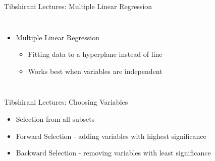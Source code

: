 \documentclass{beamer}
\begin{document}
\begin{frame}{Tibshirani Lectures: Multiple Linear Regression}
\begin{columns}
	\begin{itemize}
		\item<1-> Multiple Linear Regression
		\begin{itemize}
			\item<1-> Fitting data to a hyperplane instead of line
			\item<1-> Works best when variables are independent
		\end{itemize}
	\end{itemize}
\end{columns}	
\end{frame}

\begin{frame}{Tibshirani Lectures: Choosing Variables}
	\begin{itemize}
		\item<1-> Selection from all subsets
		\item<1-> Forward Selection - adding variables with highest significance
		\item<1-> Backward Selection - removing variables with least significance
	\end{itemize}
\end{frame}

\end{document}
